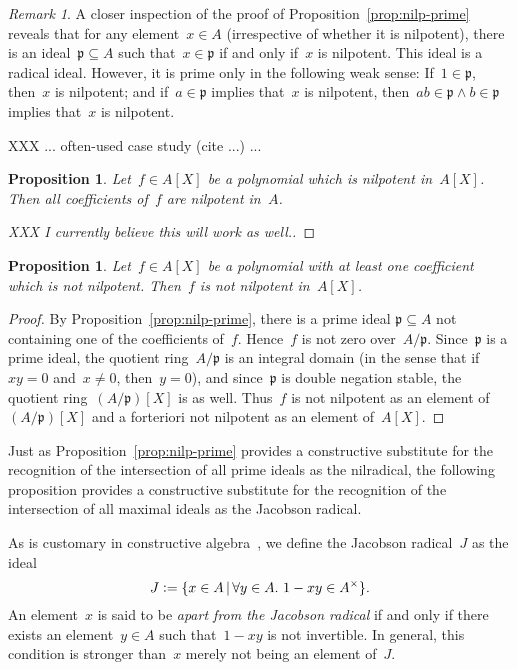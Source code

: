 \documentclass[oneside,reqno]{amsart}
\theoremstyle{definition}
\theoremstyle{plain}
\newtheorem{prop}[defn]{Proposition}
\theoremstyle{remark}
\newtheorem{rem}[defn]{Remark}
\newcommand{\ppp}{\mathfrak{p}}
\newcommand{\defeq}{\vcentcolon=}
\renewcommand{\_}{\mathpunct{.}\,}
\begin{document}
\begin{rem}A closer inspection of the proof of
Proposition~\ref{prop:nilp-prime} reveals that for any element~$x \in A$
(irrespective of whether it is nilpotent), there is an ideal~$\ppp \subseteq A$
such that~$x \in \ppp$ if and only if~$x$ is nilpotent. This ideal is a radical ideal. However, it is
prime only in the following weak sense: If~$1 \in \ppp$, then~$x$ is nilpotent;
and if~$a \in \ppp$ implies that~$x$ is nilpotent, then~$ab \in \ppp \wedge b
\in \ppp$ implies that~$x$ is nilpotent.
\end{rem}

XXX ... often-used case study (cite ...) ...

\begin{prop}Let~$f \in A[X]$ be a polynomial which is nilpotent in~$A[X]$. Then
all coefficients of~$f$ are nilpotent in~$A$.
\end{prop}

\begin{proof}[XXX I currently believe this will work as well.]
\end{proof}

\begin{prop}\label{prop:nilp-coefficients}Let~$f \in A[X]$ be a polynomial with at least one coefficient
which is not nilpotent. Then~$f$ is not nilpotent in~$A[X]$.
\end{prop}

\begin{proof}By Proposition~\ref{prop:nilp-prime}, there is a prime ideal
$\ppp \subseteq A$ not containing one of the coefficients of~$f$. Hence~$f$ is
not zero over~$A/\ppp$. Since~$\ppp$ is a prime ideal, the quotient
ring~$A/\ppp$ is an integral domain (in the sense that if~$xy = 0$ and~$x \neq
0$, then~$y = 0$), and since~$\ppp$ is double negation stable, the quotient ring~$(A/\ppp)[X]$ is as well. Thus~$f$ is not nilpotent
as an element of~$(A/\ppp)[X]$ and a forteriori not nilpotent as an element
of~$A[X]$.\end{proof}

Just as Proposition~\ref{prop:nilp-prime} provides a constructive substitute
for the recognition of the intersection of all prime ideals as the nilradical,
the following proposition provides a constructive substitute for the
recognition of the intersection of all maximal ideals as the Jacobson radical.

As is customary in constructive
algebra~\cite[Section~IX.1]{lombardi-quitte:constructive-algebra}, we define
the Jacobson radical~$J$ as the ideal
\[ J \defeq \{ x \in A \,|\, \forall y \in A\_ 1 - xy \in A^\times \}. \]
An element~$x$ is said to be \emph{apart from the Jacobson radical} if and only if
there exists an element~$y \in A$ such that~$1-xy$ is not invertible. In
general, this condition is stronger than~$x$ merely not being an element of~$J$.
\end{document}
